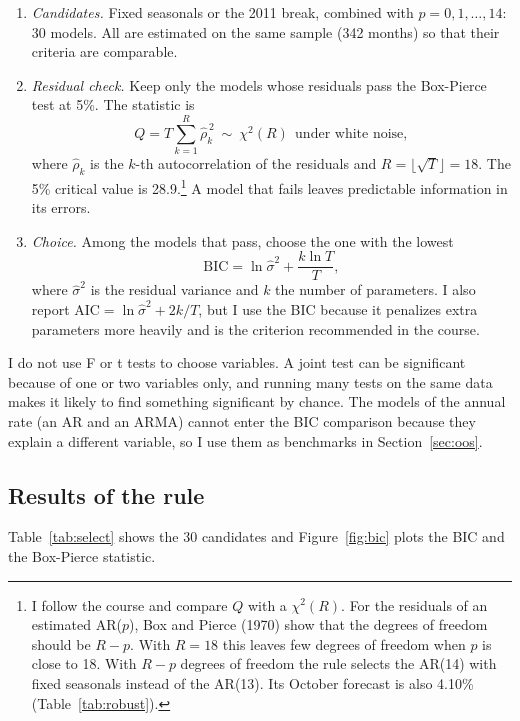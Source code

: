 \documentclass[11pt]{article}
\begin{document}
\begin{enumerate}
\item \emph{Candidates.} Fixed seasonals or the 2011 break, combined with $p=0,1,\dots,14$: 30 models. All are estimated on the same sample (342 months) so that their criteria are comparable.
\item \emph{Residual check.} Keep only the models whose residuals pass the Box-Pierce test at 5\%. The statistic is
\begin{equation}
Q = T\sum_{k=1}^{R}\hat\rho_k^{\,2}\ \sim\ \chi^2(R)\ \ \text{under white noise},
\label{eq:bp}
\end{equation}
where $\hat\rho_k$ is the $k$-th autocorrelation of the residuals and $R=\lfloor\sqrt{T}\rfloor=18$. The 5\% critical value is 28.9.\footnote{I follow the course and compare $Q$ with a $\chi^2(R)$. For the residuals of an estimated AR($p$), Box and Pierce (1970) show that the degrees of freedom should be $R-p$. With $R=18$ this leaves few degrees of freedom when $p$ is close to 18. With $R-p$ degrees of freedom the rule selects the AR(14) with fixed seasonals instead of the AR(13). Its October forecast is also 4.10\% (Table~\ref{tab:robust}).} A model that fails leaves predictable information in its errors.
\item \emph{Choice.} Among the models that pass, choose the one with the lowest
\begin{equation}
\text{BIC} = \ln\hat\sigma^2 + \frac{k\ln T}{T},
\label{eq:bic}
\end{equation}
where $\hat\sigma^2$ is the residual variance and $k$ the number of parameters. I also report $\text{AIC}=\ln\hat\sigma^2+2k/T$, but I use the BIC because it penalizes extra parameters more heavily and is the criterion recommended in the course.
\end{enumerate}

I do not use F or t tests to choose variables. A joint test can be significant because of one or two variables only, and running many tests on the same data makes it likely to find something significant by chance. The models of the annual rate (an AR and an ARMA) cannot enter the BIC comparison because they explain a different variable, so I use them as benchmarks in Section~\ref{sec:oos}.

\subsection{Results of the rule}

Table~\ref{tab:select} shows the 30 candidates and Figure~\ref{fig:bic} plots the BIC and the Box-Pierce statistic.
\end{document}
